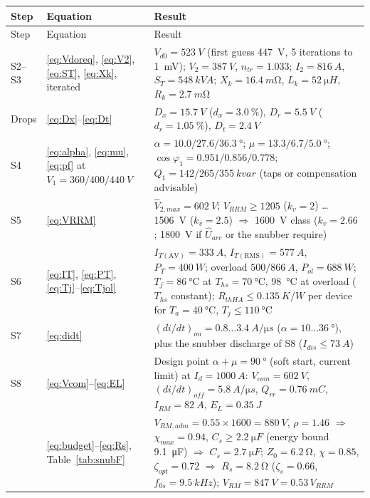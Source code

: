 \documentclass[10pt,a4paper]{scrartcl}
\newcommand{\Vdo}{V_{d0}}
\newcommand{\Id}{I_{d}}
\newcommand{\Vll}{V_{2}}
\newcommand{\Xk}{X_{k}}
\newcommand{\Lk}{L_{k}}
\newcommand{\Rk}{R_{k}}
\newcommand{\Dx}{D_{x}}
\newcommand{\Dr}{D_{r}}
\newcommand{\Dt}{D_{t}}
\newcommand{\ITav}{I_{T\mathrm{(AV)}}}
\newcommand{\ITrms}{I_{T\mathrm{(RMS)}}}
\newcommand{\VRRM}{V_{RRM}}
\newcommand{\Tj}{T_{j}}
\begin{document}
{\small
\begin{longtable}{@{}l>{\raggedright\arraybackslash}p{}>{\raggedright\arraybackslash}p{}@{}}
\toprule
Step & Equation & Result \\
\midrule
\endfirsthead
\toprule
Step & Equation & Result \\
\midrule
\endhead
\bottomrule
\endlastfoot
S2--S3 & \eqref{eq:Vdoreq}, \eqref{eq:V2}, \eqref{eq:ST}, \eqref{eq:Xk}, iterated & $\Vdo = \SI{523}{V}$ (first guess \SI{447}{V}, 5 iterations to \SI{1}{mV}); $\Vll = \SI{387}{V}$, $n_{tr} = 1.033$; $I_2 = \SI{816}{A}$, $S_T = \SI{548}{kVA}$; $\Xk = \SI{16.4}{m\ohm}$, $\Lk = \SI{52}{\micro H}$, $\Rk = \SI{2.7}{m\ohm}$ \\
Drops & \eqref{eq:Dx}--\eqref{eq:Dt} & $\Dx = \SI{15.7}{V}$ ($d_x = \SI{3.0}{\percent}$), $\Dr = \SI{5.5}{V}$ ($d_r = \SI{1.05}{\percent}$), $\Dt = \SI{2.4}{V}$ \\
S4 & \eqref{eq:alpha}, \eqref{eq:mu}, \eqref{eq:pf} at $V_1 = 360/400/\SI{440}{V}$ & $\alpha = 10.0/27.6/\SI{36.3}{\degree}$; $\mu = 13.3/6.7/\SI{5.0}{\degree}$; $\cos\varphi_1 = 0.951/0.856/0.778$; $Q_1 = 142/265/\SI{355}{kvar}$ (taps or compensation advisable) \\
S5 & \eqref{eq:VRRM} & $\hat V_{2,max} = \SI{602}{V}$; $\VRRM \ge 1205$ ($k_v = 2$) \ldots \SI{1506}{V} ($k_v = 2.5$) $\Rightarrow$ \SI{1600}{V} class ($k_v = 2.66$; \SI{1800}{V} if $\hat U_{arc}$ or the snubber require) \\
S6 & \eqref{eq:IT}, \eqref{eq:PT}, \eqref{eq:Tj}--\eqref{eq:Tjol} & $\ITav = \SI{333}{A}$, $\ITrms = \SI{577}{A}$, $P_T = \SI{400}{W}$; overload $500/\SI{866}{A}$, $P_{ol} = \SI{688}{W}$; $\Tj = \SI{86}{\celsius}$ at $T_{hs} = \SI{70}{\celsius}$, \SI{98}{\celsius} at overload ($T_{hs}$ constant); $R_{thHA} \le \SI{0.135}{K/W}$ per device for $T_a = \SI{40}{\celsius}$, $\Tj \le \SI{110}{\celsius}$ \\
S7 & \eqref{eq:didt} & $(di/dt)_{on} = 0.8\ldots\SI{3.4}{A/\micro s}$ ($\alpha = 10\ldots\SI{36}{\degree}$), plus the snubber discharge of S8 ($I_{dis}\le\SI{73}{A}$) \\
S8 & \eqref{eq:Vcom}--\eqref{eq:EL} & Design point $\alpha+\mu = \SI{90}{\degree}$ (soft start, current limit) at $\Id = \SI{1000}{A}$: $V_{com} = \SI{602}{V}$, $(di/dt)_{off} = \SI{5.8}{A/\micro s}$, $Q_{rr} = \SI{0.76}{mC}$, $I_{RM} = \SI{82}{A}$, $E_L = \SI{0.35}{J}$ \\
 & \eqref{eq:budget}--\eqref{eq:Rs}, Table~\ref{tab:snubF} & $V_{RM,adm} = 0.55\times1600 = \SI{880}{V}$, $\rho = 1.46$ $\Rightarrow$ $\chi_{max} = 0.94$, $C_s \ge \SI{2.2}{\micro F}$ (energy bound \SI{9.1}{\micro F}) $\Rightarrow$ $C_s = \SI{2.7}{\micro F}$; $Z_0 = \SI{6.2}{\ohm}$, $\chi = 0.85$, $\zeta_{opt} = 0.72$ $\Rightarrow$ $R_s = \SI{8.2}{\ohm}$ ($\zeta_s = 0.66$, $f_{0s} = \SI{9.5}{kHz}$); $V_{RM} = \SI{847}{V} = 0.53\,\VRRM$ \\

\end{longtable}}
\end{document}
